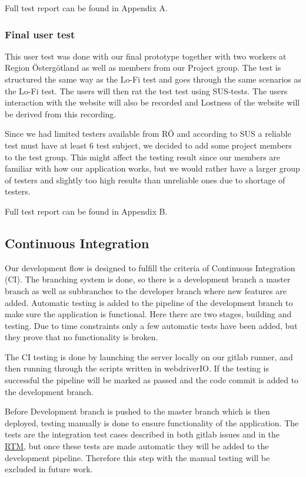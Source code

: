 Full test report can be found in Appendix A.
\subsubsection{Final user test}
This user test was done with our final prototype together with two workers at Region Östergötland as well as members from our Project group. The test is structured the same way as the Lo-Fi test and goes through the same scenarios as the Lo-Fi test. The users will then rat the test test using SUS-tests. The users interaction with the website will also be recorded and Lostness of the website will be derived from this recording. 

Since we had limited testers available from RÖ and according to SUS a reliable test must have at least 6 test subject, we decided to add some project members to the test group. This might affect the testing result since our members are familiar with how our application works, but we would rather have a larger group of testers and slightly too high results than unreliable ones due to shortage of testers. 

Full test report can be found in Appendix B.
\subsection{Continuous Integration}
Our development flow is designed to fulfill the criteria of Continuous Integration (CI). The branching system is done, so there is a development branch a master branch as well as subbranches to the developer branch where new features are added. Automatic testing is added to the pipeline of the development branch to make sure the application is functional. Here there are two stages, building and testing. Due to time constraints only a few automatic tests have been added, but they prove that no functionality is broken. 

The CI testing is done by launching the server locally on our gitlab runner, and then running through the scripts written in webdriverIO. If the testing is successful the pipeline will be marked as passed and the code commit is added to the development branch.

Before Development branch is pushed to the master branch which is then deployed, testing manually is done to ensure functionality of the application. The tests are the integration test cases described in both gitlab issues and in the \href{https://gitlab.liu.se/tddc88-company-3-2020/deploy/-/tree/Document_branch/RTM}{\underline RTM}, but once these tests are made automatic they will be added to the development pipeline. Therefore this step with the manual testing will be excluded in future work.

